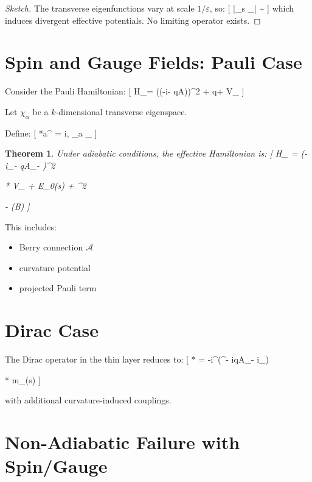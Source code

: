 \documentclass[11pt]{article}
\newtheorem{theorem}{Theorem}
\begin{document}
\begin{proof}[Sketch]
The transverse eigenfunctions vary at scale $1/\varepsilon$, so:
[
|\nabla_s \chi_\varepsilon| \sim {}
]
which induces divergent effective potentials. No limiting operator exists.
\end{proof}

\section{Spin and Gauge Fields: Pauli Case}

Consider the Pauli Hamiltonian:
[
H_\varepsilon = (\boldsymbol{\sigma}\cdot(-i\hbar\nabla - qA))^2 + q\Phi + V_\varepsilon
]

Let ${\chi_\alpha}$ be a $k$-dimensional transverse eigenspace.

Define:
[
*a^{\alpha\beta} = i\langle \chi*\alpha, \partial_a \chi_\beta\rangle
]

\begin{theorem}
Under adiabatic conditions, the effective Hamiltonian is:
[
H_{} =
(-i\hbar\nabla_\Sigma - qA_\parallel - \hbar {})^2

* V_{} + E_0(s) + \hbar^2 

- \Pi(\boldsymbol{\sigma}\cdot B)
  ]
  \end{theorem}

This includes:
\begin{itemize}
\item Berry connection $\mathcal{A}$
\item curvature potential
\item projected Pauli term
\end{itemize}

\section{Dirac Case}

The Dirac operator in the thin layer reduces to:
[
*{} =
-i\hbar \alpha^\alpha(\nabla*\alpha^\Sigma - iqA_\alpha - i_\alpha)

* \beta m_{}(s)
  ]

with additional curvature-induced couplings.

\section{Non-Adiabatic Failure with Spin/Gauge}
\end{document}
